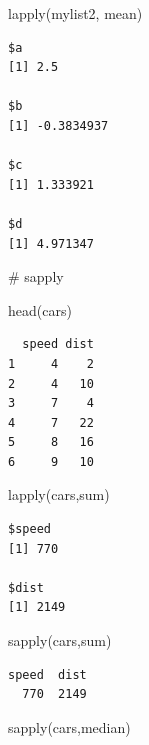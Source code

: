 \documentclass[
  letterpaper,
  DIV=11,
  numbers=noendperiod]{scrreprt}
\newenvironment{Shaded}{\begin{snugshade}}{\end{snugshade}}
\newcommand{\CommentTok}[1]{\textcolor[rgb]{0.37,0.37,0.37}{#1}}
\newcommand{\FunctionTok}[1]{\textcolor[rgb]{0.28,0.35,0.67}{#1}}
\newcommand{\NormalTok}[1]{\textcolor[rgb]{0.00,0.23,0.31}{#1}}
\begin{document}
\begin{Shaded}
\begin{Highlighting}[]
\FunctionTok{lapply}\NormalTok{(mylist2, mean)}
\end{Highlighting}
\end{Shaded}

\begin{verbatim}
$a
[1] 2.5

$b
[1] -0.3834937

$c
[1] 1.333921

$d
[1] 4.971347
\end{verbatim}

\begin{Shaded}
\begin{Highlighting}[]
\CommentTok{\# sapply}

\FunctionTok{head}\NormalTok{(cars)}
\end{Highlighting}
\end{Shaded}

\begin{verbatim}
  speed dist
1     4    2
2     4   10
3     7    4
4     7   22
5     8   16
6     9   10
\end{verbatim}

\begin{Shaded}
\begin{Highlighting}[]
\FunctionTok{lapply}\NormalTok{(cars,sum)}
\end{Highlighting}
\end{Shaded}

\begin{verbatim}
$speed
[1] 770

$dist
[1] 2149
\end{verbatim}

\begin{Shaded}
\begin{Highlighting}[]
\FunctionTok{sapply}\NormalTok{(cars,sum)}
\end{Highlighting}
\end{Shaded}

\begin{verbatim}
speed  dist 
  770  2149 
\end{verbatim}

\begin{Shaded}
\begin{Highlighting}[]
\FunctionTok{sapply}\NormalTok{(cars,median)}
\end{Highlighting}
\end{Shaded}
\end{document}
